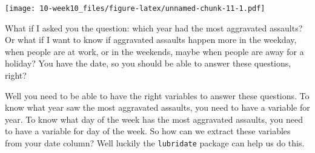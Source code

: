 \documentclass[]{book}
\newenvironment{Shaded}{\begin{snugshade}}{\end{snugshade}}
\newcommand{\DataTypeTok}[1]{\textcolor[rgb]{0.13,0.29,0.53}{#1}}
\newcommand{\KeywordTok}[1]{\textcolor[rgb]{0.13,0.29,0.53}{\textbf{#1}}}
\newcommand{\NormalTok}[1]{#1}
\newcommand{\OperatorTok}[1]{\textcolor[rgb]{0.81,0.36,0.00}{\textbf{#1}}}
\newcommand{\OtherTok}[1]{\textcolor[rgb]{0.56,0.35,0.01}{#1}}
\newcommand{\StringTok}[1]{\textcolor[rgb]{0.31,0.60,0.02}{#1}}
\begin{document}
\begin{Shaded}
\end{Shaded}

\texttt{[image: 10-week10\_files/figure-latex/unnamed-chunk-11-1.pdf]}

What if I asked you the question: which year had the most aggravated assaults? Or what if I want to know if aggravated assaults happen more in the weekday, when people are at work, or in the weekends, maybe when people are away for a holiday? You have the date, so you should be able to answer these questions, right?

Well you need to be able to have the right variables to answer these questions. To know what year saw the most aggravated assaults, you need to have a variable for year. To know what day of the week has the most aggravated assaults, you need to have a variable for day of the week. So how can we extract these variables from your date column? Well luckily the \texttt{lubridate} package can help us do this.

\begin{Shaded}
\end{Shaded}
\end{document}
